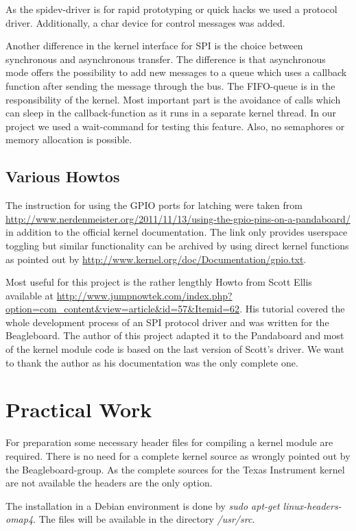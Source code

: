As the spidev-driver is for rapid prototyping or quick hacks we used a protocol driver. Additionally, a char device for control messages was added.

Another difference in the kernel interface for SPI is the choice between synchronous and asynchronous transfer. The difference is that asynchronous 
mode offers the possibility to add new messages to a queue which uses a callback function after sending the message through the bus. The FIFO-queue 
is in the responsibility of the kernel. Most important part is the avoidance of calls which can sleep in the callback-function as it runs in a 
separate kernel thread. In our project we used a wait-command for testing this feature. Also, no semaphores or memory allocation is possible.

\subsection{Various Howtos}

The instruction for using the GPIO ports for latching were taken from
\url{http://www.nerdenmeister.org/2011/11/13/using-the-gpio-pins-on-a-pandaboard/} in addition to the official kernel documentation.
The link only provides userspace toggling but similar functionality can be archived by using direct kernel functions as pointed out 
by \url{http://www.kernel.org/doc/Documentation/gpio.txt}.

Most useful for this project is the rather lengthly Howto from Scott Ellis available at \url{http://www.jumpnowtek.com/index.php?option=com\_content&view=article&id=57&Itemid=62}. His tutorial covered the whole development process of an SPI protocol driver and was 
written for the Beagleboard. The author of this project adapted it to the Pandaboard and most of the kernel module code is based on the last
version of Scott's driver. We want to thank the author as his documentation was the only complete one.

\section{Practical Work}

For preparation some necessary header files for compiling a kernel module are required. There is no need for a complete kernel source as 
wrongly pointed out by the Beagleboard-group. As the complete sources for the Texas Instrument kernel are not available the headers 
are the only option. 

The installation in a Debian environment is done by \textsl{sudo apt-get linux-headers-omap4}. The files will be available in the 
directory \textsl{/usr/src}.


